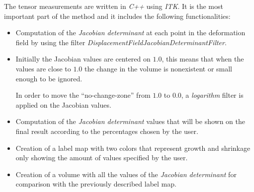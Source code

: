 The tensor measurements are written in \textit{C++} using
\textit{ITK}. It is the most important part of the method and it
includes the following functionalities:
\begin{itemize}
\item Computation of the \textit{Jacobian determinant} at each point
  in the deformation field by using the filter
  \textit{DisplacementFieldJacobianDeterminantFilter}.
\item Initially the Jacobian values are centered on $1.0$, this means
  that when the values are close to $1.0$ the change in the volume is
  nonexistent or small enough to be ignored. 

  In order to move the ``no-change-zone'' from $1.0$ to $0.0$, a
  \textit{logarithm} filter is applied on the Jacobian values.
  
\item Computation of the \textit{Jacobian determinant} values that
  will be shown on the final result according to the percentages
  chosen by the user.
\item Creation of a label map with two colors that represent growth
  and shrinkage only showing the amount of values specified by the
  user.
\item Creation of a volume with all the values of the \textit{Jacobian
    determinant} for comparison with the previously described label
  map.
\end{itemize}
